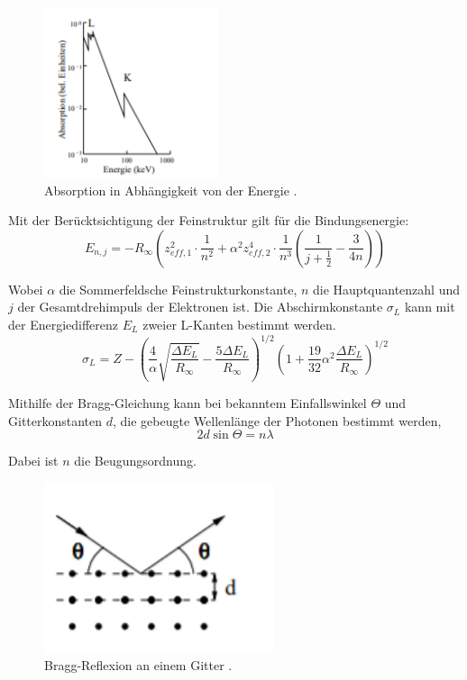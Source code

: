 \begin{figure}[H]
  \centering
  \includegraphics[height=5cm]{kante.PNG}
  \caption{Absorption in Abhängigkeit von der Energie \cite{sample}.}
  \label{fig:kathode}
\end{figure}

Mit der Berücktsichtigung der Feinstruktur gilt für die Bindungsenergie:
\begin{equation}
E_{n,j} = -R_{\infty} \left( z_{eff,1}^2 \cdot \frac{1}{n^2} + \alpha^2 z_{eff,2}^4 \cdot \frac{1}{n^3}
\left(\frac{1}{j+ \frac{1}{2}} - \frac{3}{4n} \right) \right)
\end{equation}

Wobei $\alpha$ die Sommerfeldsche Feinstrukturkonstante, $n$ die Hauptquantenzahl und $j$ der Gesamtdrehimpuls der
Elektronen ist.
Die Abschirmkonstante $\sigma_L$ kann mit der Energiedifferenz $E_L$ zweier L-Kanten bestimmt werden.
\begin{equation}
  \sigma_L = Z -\left(\frac{4}{\alpha} \sqrt{\frac{\Delta E_L}{R_{\infty}}} - \frac{5 \Delta E_L}{R_{\infty}} \right)^{1/2}
  \left(1 + \frac{19}{32} \alpha^2  \frac{\Delta E_L}{R_{\infty}} \right)^{1/2}
\end{equation}


Mithilfe der Bragg-Gleichung kann bei bekanntem Einfallswinkel $\Theta$ und Gitterkonstanten $d$, die gebeugte Wellenlänge
der Photonen bestimmt werden,
\begin{equation}
  2d \sin{\Theta} = n \lambda
\end{equation}

Dabei ist $n$ die Beugungsordnung.

\begin{figure}[H]
  \centering
  \includegraphics[height=5cm]{bragg.PNG}
  \caption{Bragg-Reflexion an einem Gitter \cite{sample}.}
  \label{fig:kathode}
\end{figure}
